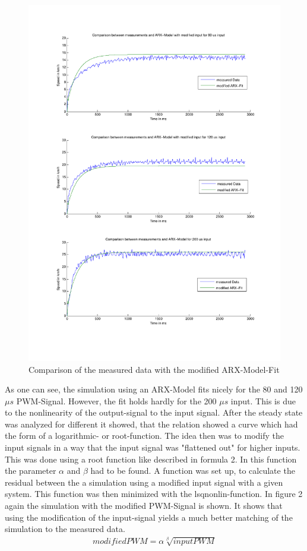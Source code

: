 \documentclass[twoside]{article}
\begin{document}
\begin{figure}[h!]
\begin{minipage}{0.5\textwidth}
\includegraphics[scale=0.4]{comparison2.pdf}
\caption{Comparison of the measured data with the modified ARX-Model-Fit}
\end{minipage}
\end{figure}
As one can see, the simulation using an ARX-Model fits nicely for the 80 and 120 $\mu s$ PWM-Signal. However, the fit holds hardly for the 200 $\mu s$ input. This is due to the nonlinearity of the output-signal to the input signal. After the steady state was analyzed for different it showed, that the relation showed a curve which had the form of a logarithmic- or root-function. The idea then was to modify the input signals in a way that the input signal was "flattened out" for higher inputs. This was done using a root function like described in formula 2. In this function the parameter $\alpha$ and $\beta$ had to be found. A function was set up, to calculate the residual between the a simulation using a modified input signal with a given system. This function was then minimized with the lsqnonlin-function. In figure 2 again the simulation with the modified PWM-Signal is shown. It shows that using the modification of the input-signal yields a much better matching of the simulation to the measured data.
\begin{align}
modifiedPWM = \alpha \sqrt[\beta]{inputPWM}
\end{align}
\end{document}
